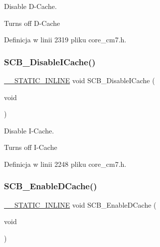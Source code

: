 Disable D-\/\+Cache. 

Turns off D-\/\+Cache 

Definicja w linii 2319 pliku core\+\_\+cm7.\+h.

\mbox{\label{group___c_m_s_i_s___core___cache_functions_gaba757390852f95b3ac2d8638c717d8d8}} 
\subsubsection{\texorpdfstring{S\+C\+B\+\_\+\+Disable\+I\+Cache()}{SCB\_DisableICache()}}
{\footnotesize\ttfamily \hyperlink{cmsis__iccarm_8h_aba87361bfad2ae52cfe2f40c1a1dbf9c}{\+\_\+\+\_\+\+S\+T\+A\+T\+I\+C\+\_\+\+I\+N\+L\+I\+NE} void S\+C\+B\+\_\+\+Disable\+I\+Cache (\begin{DoxyParamCaption}\item[{void}]{ }\end{DoxyParamCaption})}



Disable I-\/\+Cache. 

Turns off I-\/\+Cache 

Definicja w linii 2248 pliku core\+\_\+cm7.\+h.

\mbox{\label{group___c_m_s_i_s___core___cache_functions_ga63aa640d9006021a796a5dcf9c7180b6}} 
\subsubsection{\texorpdfstring{S\+C\+B\+\_\+\+Enable\+D\+Cache()}{SCB\_EnableDCache()}}
{\footnotesize\ttfamily \hyperlink{cmsis__iccarm_8h_aba87361bfad2ae52cfe2f40c1a1dbf9c}{\+\_\+\+\_\+\+S\+T\+A\+T\+I\+C\+\_\+\+I\+N\+L\+I\+NE} void S\+C\+B\+\_\+\+Enable\+D\+Cache (\begin{DoxyParamCaption}\item[{void}]{ }\end{DoxyParamCaption})}



